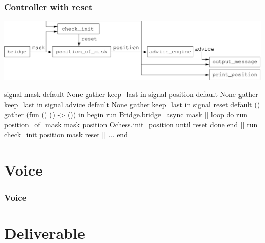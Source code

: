 \documentclass[t]{beamer}
\begin{document}

\begin{frame}[fragile]
\frametitle{Controller with reset}

\includegraphics[scale=0.6]{figures/controller-with-reset}

\begin{lstrml}
  signal mask default None gather keep_last in
  signal position default None gather keep_last in
  signal advice default None gather keep_last in
  signal reset default () gather (fun () () -> ()) in
  begin
    run Bridge.bridge_async mask ||
    loop
      do
        run position_of_mask mask position Ochess.init_position
      until reset done
    end ||
    run check_init position mask reset ||
    ...
  end
\end{lstrml}

\end{frame}


\section{Voice}

\begin{frame}[fragile]
\frametitle{Voice}


\end{frame}

\section{Deliverable}
\end{document}

